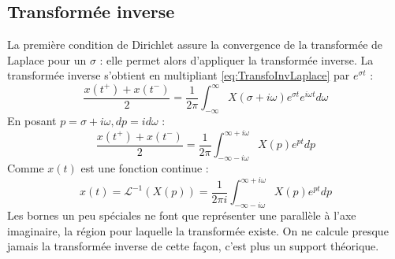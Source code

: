 	
	
	\subsection{Transformée inverse}
	La première condition de Dirichlet assure la convergence de la transformée de 
	Laplace pour un $\sigma$ : elle permet alors d'appliquer la transformée inverse.
	La transformée inverse s'obtient en multipliant \autoref{eq:TransfoInvLaplace} 
	par $e^{\sigma t}$ :
	\begin{equation}
	\frac{x(t^+)+x(t^-)}{2} = \frac{1}{2\pi}\int_{-\infty}^\infty X
	(\sigma + i\omega)e^{\sigma t} e^{i\omega t}d\omega
	\end{equation}
	En posant $p = \sigma + i\omega, dp = id\omega$ :
	\begin{equation}
	\frac{x(t^+)+x(t^-)}{2} = \frac{1}{2\pi}\int_{-\infty-i\omega}^{\infty+i\omega} X
	(p)e^{pt}dp
	\end{equation}
	Comme $x(t)$ est une fonction continue :
	\begin{equation}
	x(t) = \mathcal{L}^{-1}(X(p)) = \frac{1}{2\pi i}\int_{-\infty-i\omega}^{\infty+i
	\omega} X(p)e^{pt}dp
	\end{equation}
	Les bornes un peu spéciales ne font que représenter une parallèle à l'axe 
	imaginaire, la région pour laquelle la transformée existe. On ne calcule presque
	jamais la transformée inverse de cette façon, c'est plus un support théorique.


